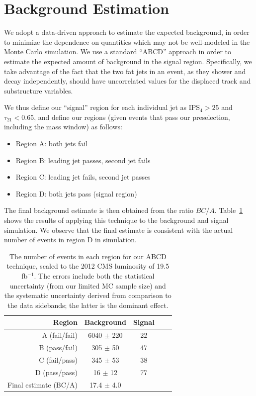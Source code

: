 \documentclass{JHEP3}
\newcommand{\IPS}{\textrm{IPS}}
\begin{document}
\section{Background Estimation}
\label{sec:background}

We adopt a data-driven approach to estimate the expected background, in order to minimize the dependence on
quantities which may not be well-modeled in the Monte Carlo simulation. We use a standard ``ABCD'' approach in
order to estimate the expected amount of background in the signal region. Specifically, we take advantage
of the fact that the two fat jets in an event, as they shower and decay independently, should have uncorrelated
values for the displaced track and substructure variables.

We thus define our ``signal'' region for each individual jet as $\IPS_{4} > 25$ and $\tau_{21} < 0.65$, and define our regions (given events that pass our preselection, including the mass window) as follows:

\begin{itemize}
\item Region A: both jets fail
\item Region B: leading jet passes, second jet fails
\item Region C: leading jet fails, second jet passes
\item Region D: both jets pass (signal region)
\end{itemize}

The final background estimate is then obtained from the ratio $BC/A$. Table~\ref{tab:TnP} shows the results of
applying this technique to the background and signal simulation. We observe that the final estimate is
consistent with the actual number of events in region D in simulation.

\begin{table}[h]
\begin{center}
\begin{tabular}{|r|c|c|c|c|}
\hline
Region & Background & Signal \\
\hline
A (fail/fail) & 6040 $\pm$ 220 & 22 \\
B (pass/fail) & 305 $\pm$ 50 & 47 \\
C (fail/pass) & 345 $\pm$ 53 & 38 \\
D (pass/pass) & 16 $\pm$ 12 & 77 \\
\hline
Final estimate (BC/A) & 17.4 $\pm$ 4.0 & \\
\hline
\end{tabular}
\end{center}
\caption{The number of events in each region for our ABCD technique, scaled to the 2012 CMS luminosity
  of 19.5 fb$^{-1}$. The errors include both the statistical
  uncertainty (from our limited MC sample size) and the systematic
  uncertainty derived from comparison to the data sidebands; the
  latter is the dominant effect.}
\label{tab:TnP}
\end{table}
\end{document}
